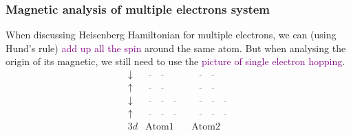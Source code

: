 \documentclass{beamer}
\begin{document}
  \begin{frame}
    \frametitle{Magnetic analysis of multiple electrons system}
    When discussing Heisenberg Hamiltonian for multiple electrons, we can (using Hund's rule) \textcolor{purple}{add up all the spin} around the same atom. But when analysing the origin of its magnetic, we still need to use the \textcolor{purple}{picture of single electron hopping}.
    \begin{equation*}
      \begin{matrix}
      \downarrow&\overline{\hspace{1em}}\;\overline{\hspace{1em}}\ \ &\ \  \overline{\hspace{1em}}\;\overline{\hspace{1em}}\\
      \uparrow&\overline{\hspace{1em}}\;\overline{\hspace{1em}}\ \ &\ \  \overline{\hspace{1em}}\;\overline{\hspace{1em}}\\[0.6em]
      \downarrow&\overline{\hspace{1em}}\;\overline{\hspace{1em}}\;\overline{\hspace{1em}}\ \ &\ \  \overline{\hspace{1em}}\;\overline{\hspace{1em}}\;\overline{\hspace{1em}}\\
      \uparrow&\overline{\hspace{1em}}\;\overline{\hspace{1em}}\;\overline{\hspace{1em}}\ \ &\ \  \overline{\hspace{1em}}\;\overline{\hspace{1em}}\;\overline{\hspace{1em}}\\[0.6em]
      3d &\text{Atom1} & \text{Atom2}
      \end{matrix}
    \end{equation*}
  \end{frame}
\end{document}
